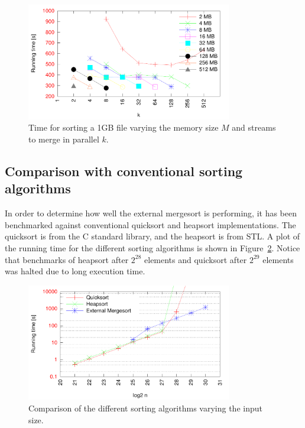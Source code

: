 \documentclass[a4paper,12pt]{article}
\begin{document}
\begin{figure}[h!]
  \centering
  \includegraphics[width=0.8\textwidth]{sorting2}
  \caption{Time for sorting a 1GB file varying the memory size $M$ and
    streams to merge in parallel $k$.}
  \label{fig:sorting}
\end{figure}

\subsection{Comparison with conventional sorting algorithms}
In order to determine how well the external mergesort is performing,
it has been benchmarked against conventional quicksort and heapsort
implementations. The quicksort is from the C standard library, and
the heapsort is from STL. A plot of the running time for the
different sorting algorithms is shown in Figure~\ref{fig:best-sort}. Notice that benchmarks of heapsort after $2^{28}$ elements and quicksort after $2^{29}$ elements was halted due to long execution time.

\begin{figure}[h!]
  \centering
  \includegraphics[width=0.8\textwidth]{best_sort}
  \caption{Comparison of the different sorting algorithms varying the input size.}
  \label{fig:best-sort}
\end{figure}
\end{document}
